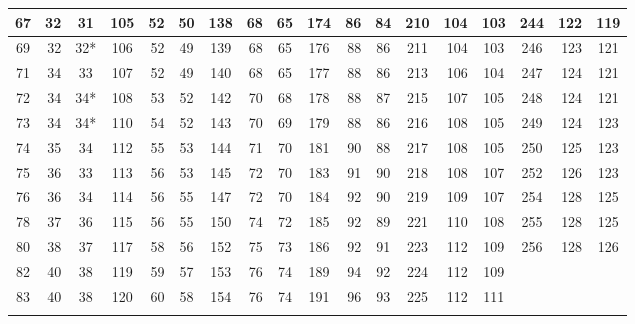 \documentclass{article}
\theoremstyle{definition}
\theoremstyle{remark}
\begin{document}
\begin{table}[p]
{\begin{minipage}{0.92\textheight}
{\begin{tabular}{c|r|c||c|r|c||c|r|c||c|r|c||c|r|c||c|r|c}
\hline
67 & 32 & 31 & 105 & 52 & 50 & 138 & 68 & 65 & 174 & 86 & 84 & 210 & 104 & 103 & 244 & 122 & 119\\
\hline
69 & 32 & 32* & 106 & 52 & 49 & 139 & 68 & 65 & 176 & 88 & 86 & 211 & 104 & 103 & 246 & 123 & 121\\
\hline
71 & 34 & 33 & 107 & 52 & 49 & 140 & 68 & 65 & 177 & 88 & 86 & 213 & 106 & 104 & 247 & 124 & 121\\
\hline
72 & 34 & 34* & 108 & 53 & 52 & 142 & 70 & 68 & 178 & 88 & 87 & 215 & 107 & 105 & 248 & 124 & 121\\
\hline
73 & 34 & 34* & 110 & 54 & 52 & 143 & 70 & 69 & 179 & 88 & 86 & 216 & 108 & 105 & 249 & 124 & 123\\
\hline
74 & 35 & 34 & 112 & 55 & 53 & 144 & 71 & 70 & 181 & 90 & 88 & 217 & 108 & 105 & 250 & 125 & 123\\
\hline
75 & 36 & 33 & 113 & 56 & 53 & 145 & 72 & 70 & 183 & 91 & 90 & 218 & 108 & 107 & 252 & 126 & 123\\
\hline
76 & 36 & 34 & 114 & 56 & 55 & 147 & 72 & 70 & 184 & 92 & 90 & 219 & 109 & 107 & 254 & 128 & 125\\
\hline
78 & 37 & 36 & 115 & 56 & 55 & 150 & 74 & 72 & 185 & 92 & 89 & 221 & 110 & 108 & 255 & 128 & 125\\
\hline
80 & 38 & 37 & 117 & 58 & 56 & 152 & 75 & 73 & 186 & 92 & 91 & 223 & 112 & 109 & 256 & 128 & 126\\
\hline
82 & 40 & 38 & 119 & 59 & 57 & 153 & 76 & 74 & 189 & 94 & 92 & 224 & 112 & 109 &  &  & \\
\hline
83 & 40 & 38 & 120 & 60 & 58 & 154 & 76 & 74 & 191 & 96 & 93 & 225 & 112 & 111 &  &  & \\
\Xhline{2\arrayrulewidth}
\end{tabular}%
}
\end{minipage}%
}
\end{table}
\end{document}
